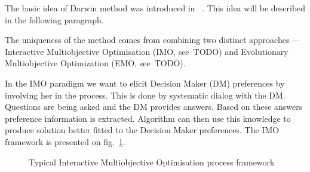 The basic idea of Darwin method was introduced in~ \cite{GMS09}. This idea will
be described in the following paragraph.

The uniqueness of the method comes from combining two distinct approaches ---
Interactive Multiobjective Optimisation (IMO, see~TODO) and Evolutionary
Multiobjective Optimization (EMO, see~TODO).

In the IMO paradigm we want to elicit Decision Maker (DM) preferences by
involving her in the process. This is done by systematic dialog with the
DM. Questions are being asked and the DM provides answers. Based on these
answers preference information is extracted. Algorithm can then use this
knowledge to produce solution better fitted to the Decision Maker
preferences. The IMO framework is presented on
fig.~\ref{fig:interactive-process}.

\begin{figure} 
  \begin{center}
    \caption{Typical Interactive Multiobjective
      Optimisation process framework\label{fig:interactive-process}}
  \end{center} 
\end{figure} 

